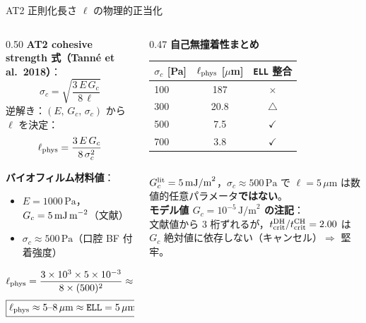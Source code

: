 \documentclass[
  ignorenonframetext,
  aspectratio=169,
]{beamer}
\begin{document}
\begin{frame}[shrink=12]{AT2 正則化長さ $\ell$ の物理的正当化}
\protect\hypertarget{at2-ell-justify}{}

\begin{columns}[T]
\begin{column}{0.50\textwidth}
\textbf{AT2 cohesive strength 式（Tanné et al.\ 2018）}：
\[
\sigma_c = \sqrt{\frac{3\,E\,G_c}{8\,\ell}}
\]
逆解き：$(E,\,G_c,\,\sigma_c)$ から $\ell$ を決定：
\[
\ell_{\rm phys} = \frac{3\,E\,G_c}{8\,\sigma_c^2}
\]

\textbf{バイオフィルム材料値}：
\begin{itemize}
\item $E = 1000\,\text{Pa}$，
      $G_c = 5\,\text{mJ\,m}^{-2}$（文献）
\item $\sigma_c \approx 500\,\text{Pa}$（口腔 BF 付着強度）
\end{itemize}
\[
\ell_{\rm phys}
= \frac{3\times10^3\times5\times10^{-3}}{8\times(500)^2}
\approx 7.5\,\mu\text{m}
\]
\[
\boxed{\ell_{\rm phys}\approx 5\text{--}8\,\mu\text{m}
\approx \texttt{ELL} = 5\,\mu\text{m} \;\checkmark}
\]

\end{column}
\begin{column}{0.47\textwidth}
\textbf{自己無撞着性まとめ}\\[4pt]
{\small
\begin{tabular}{@{}lcc@{}}
\toprule
$\sigma_c$ [Pa] & $\ell_{\rm phys}$ [$\mu$m] & \texttt{ELL} 整合\\
\midrule
100 & 187 & $\times$ \\
300 & 20.8 & $\triangle$ \\
500 & 7.5 & $\checkmark$ \\
700 & 3.8 & $\checkmark$ \\
\bottomrule
\end{tabular}
}\\[4pt]
$G_c^{\rm lit}=5\,\text{mJ/m}^2$，$\sigma_c\approx500\,\text{Pa}$ で
$\ell=5\,\mu$m は数値的任意パラメータ\textbf{ではない}。\\[6pt]

\textbf{モデル値 $G_c=10^{-5}\,\text{J/m}^2$ の注記}：\\[2pt]
{\small 文献値から 3 桁ずれるが，$t_{\rm crit}^{\rm DH}/t_{\rm crit}^{\rm CH}=2.00$ は $G_c$ 絶対値に依存しない（キャンセル）$\Rightarrow$ 堅牢。}
\end{column}
\end{columns}
\end{frame}
\end{document}
